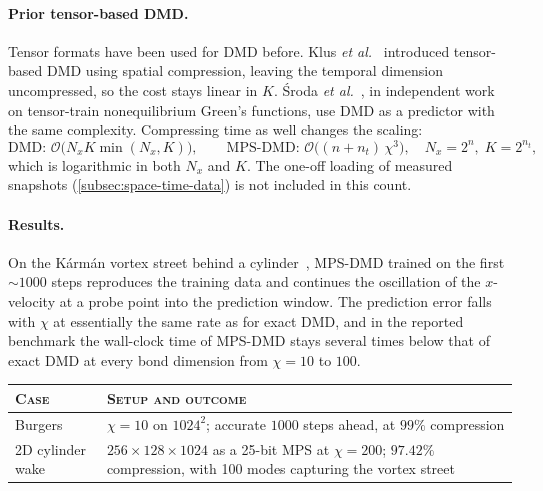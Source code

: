 \paragraph{Prior tensor-based DMD.}
Tensor formats have been used for DMD before. Klus \emph{et
al.}~\cite{Klus2018} introduced tensor-based DMD using spatial compression,
leaving the temporal dimension uncompressed, so the cost stays linear in $K$.
\'Sroda \emph{et al.}~\cite{Sroda2025}, in independent work on tensor-train
nonequilibrium Green's functions, use DMD as a predictor with the same
complexity. Compressing time as well changes the scaling:
\begin{equation}
  \text{DMD: } \mathcal O\bigl(N_x K \min(N_x, K)\bigr), \qquad
  \text{MPS-DMD: } \mathcal O\bigl((n+n_t)\,\chi^3\bigr), \quad
  N_x = 2^n,\; K = 2^{n_t} ,
  \label{eq:mps-dmd-cost}
\end{equation}%
which is logarithmic in both $N_x$ and $K$. The one-off loading of measured
snapshots (\cref{subsec:space-time-data}) is not included in this count.

\paragraph{Results.}
On the K\'arm\'an vortex street behind a cylinder~\cite{Peddinti2025a}, MPS-DMD
trained on the first $\sim\!1000$ steps reproduces the training data and
continues the oscillation of the $x$-velocity at a probe point into the
prediction window. The prediction error falls with $\chi$ at essentially the
same rate as for exact DMD, and in the reported benchmark the wall-clock time of
MPS-DMD stays several times below that of exact DMD at every bond dimension from
$\chi = 10$ to $100$.
\begin{center}
  \begin{tabular}{@{}lp{}@{}}
    \toprule
    \textsc{Case} & \textsc{Setup and outcome} \\
    \midrule
    Burgers
      & $\chi = 10$ on $1024^2$; accurate $1000$ steps ahead, at $99\%$
        compression \\
    2D cylinder wake
      & $256\times128\times1024$ as a 25-bit MPS at $\chi = 200$; $97.42\%$
        compression, with 100 modes capturing the vortex street \\
    \bottomrule
  \end{tabular}
\end{center}

